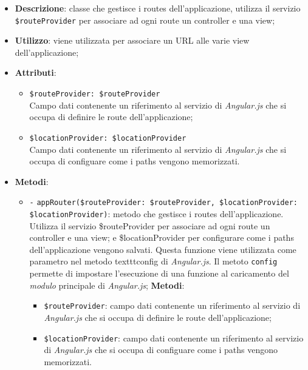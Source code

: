 	\begin{itemize}
		\item \textbf{Descrizione}: classe che gestisce i routes dell’applicazione, utilizza il servizio \texttt{\$routeProvider} per associare ad ogni route un controller e una view;
		\item \textbf{Utilizzo}: viene utilizzata per associare un URL alle varie view dell’applicazione;
		\item \textbf{Attributi}:
		\begin{itemize}
			\item \texttt{\$routeProvider: \$routeProvider}\\ Campo dati contenente un riferimento al servizio di \textit{Angular.js} che si occupa di definire le route dell’applicazione;
			\item \texttt{\$locationProvider: \$locationProvider}\\ Campo dati contenente un riferimento al servizio di \textit{Angular.js} che si occupa di configuare come i paths vengono memorizzati.
		\end{itemize}
		\item \textbf{Metodi}: 
		\begin{itemize}
			\item \texttt{-} \texttt{appRouter(\$routeProvider: \$routeProvider, \$locationProvider: \$locationProvider)}: metodo che gestisce i routes dell’applicazione. Utilizza il servizio \$routeProvider per associare ad ogni route un controller e una view; e \$locationProvider per configurare come i paths dell'applicazione vengono salvati. Questa funzione viene utilizzata come parametro nel metodo texttt{config} di \textit{Angular.js}. Il metoto \texttt{config} permette di impostare l'esecuzione di una funzione al caricamento del \textit{modulo} principale di \textit{Angular.js};
			\textbf{Metodi}:
			\begin{itemize}
				\item \texttt{\$routeProvider}: campo dati contenente un riferimento al servizio di \textit{Angular.js} che si occupa di definire le route dell’applicazione;
				\item \texttt{\$locationProvider}: campo dati contenente un riferimento al servizio di \textit{Angular.js} che si occupa di configuare come i paths vengono memorizzati.
			\end{itemize}
		\end{itemize}
	\end{itemize}
	
